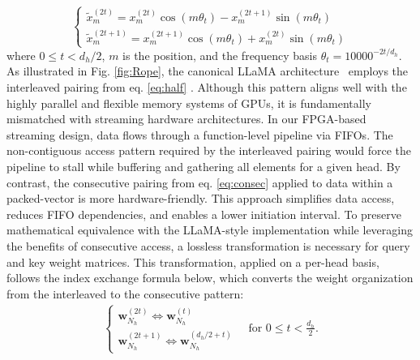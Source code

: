 \documentclass[sigconf]{acmart}
\begin{document}
\begin{equation}
\begin{cases}
\tilde{x}_m^{(2t)} = x_m^{(2t)} \cos(m\theta_t) - x_m^{(2t+1)} \sin(m\theta_t) \\
\tilde{x}_m^{(2t+1)} = x_m^{(2t+1)} \cos(m\theta_t) + x_m^{(2t)} \sin(m\theta_t)
\end{cases}\label{eq:consec}
\end{equation}
where \( 0 \leq t < d_h/2 \), \(m\) is the position, and the frequency basis \( \theta_t = 10000^{-2t/d_h} \).
As illustrated in Fig. \ref{fig:Rope}, the canonical LLaMA architecture~\cite{HuggingFaceLLaMAGithub} employs the interleaved pairing from eq. \ref{eq:half} . Although this pattern aligns well with the highly parallel and flexible memory systems of GPUs, it is fundamentally mismatched with streaming hardware architectures. In our FPGA-based streaming design, data flows through a function-level pipeline via FIFOs. The non-contiguous access pattern required by the interleaved pairing would force the pipeline to stall while buffering and gathering all elements for a given head.
By contrast, the consecutive pairing from eq. \ref{eq:consec} applied to data within a packed-vector is more hardware-friendly. This approach simplifies data access, reduces FIFO dependencies, and enables a lower initiation interval. To preserve mathematical equivalence with the LLaMA-style implementation while leveraging the benefits of consecutive access, a lossless transformation is necessary for query and key weight matrices. This transformation, applied on a per-head basis, follows the index exchange formula below, which converts the weight organization from the interleaved to the consecutive pattern:
\begin{align}
\begin{cases}
\mathbf{w}_{N_h}^{(2t)} \Leftrightarrow \mathbf{w}_{N_h}^{(t)} \\
\mathbf{w}_{N_h}^{(2t+1)} \Leftrightarrow \mathbf{w}_{N_h}^{(d_h/2 + t)}
\end{cases}
\quad \text{for } 0 \leq t < \frac{d_h}{2}.
\end{align}


\end{document}
